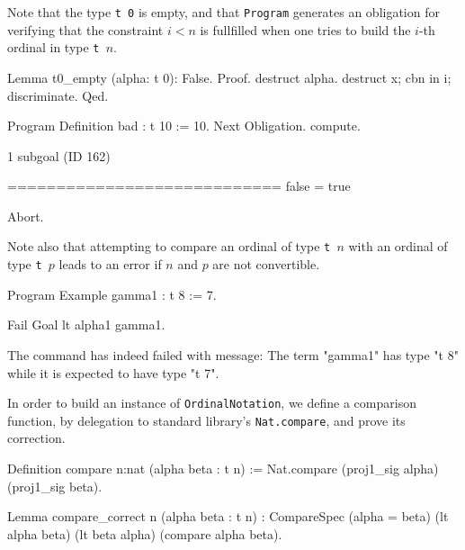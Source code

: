 Note that the type \texttt{t 0} is empty, and that \texttt{Program} generates an obligation
for verifying that the constraint $i<n$ is fullfilled when one tries to build the $i$-th ordinal in type \texttt{t $n$}.

\begin{Coqsrc}
Lemma t0_empty (alpha: t 0): False.
Proof.
  destruct alpha.
  destruct x; cbn in i; discriminate.
Qed.


Program Definition bad : t 10 := 10.
Next Obligation.
  compute.
\end{Coqsrc}

\begin{Coqanswer}
1 subgoal (ID 162)
  
  ============================
  false = true
\end{Coqanswer}

\begin{Coqsrc}
Abort.
\end{Coqsrc}

Note also that attempting to compare an ordinal of type \texttt{t $n$}  with an ordinal of
type \texttt{t $p$}  leads to an error if $n$ and $p$ are not convertible.

\begin{Coqsrc}

Program Example gamma1 : t 8 := 7.

Fail Goal lt alpha1 gamma1.
\end{Coqsrc}

\begin{Coqanswer}
 The command has indeed failed with message:
The term "gamma1" has type "t 8" while it is expected to have type "t 7".
\end{Coqanswer}


In order to build an instance of \texttt{OrdinalNotation}, we define a comparison function, by delegation to standard library's  \texttt{Nat.compare}, and prove its correction.

\begin{Coqsrc}
Definition compare {n:nat} (alpha beta : t n) :=
  Nat.compare (proj1_sig alpha) (proj1_sig beta).

Lemma compare_correct {n} (alpha beta : t n) :
  CompareSpec (alpha = beta) (lt alpha beta) (lt beta alpha)
              (compare alpha beta).
\end{Coqsrc}


